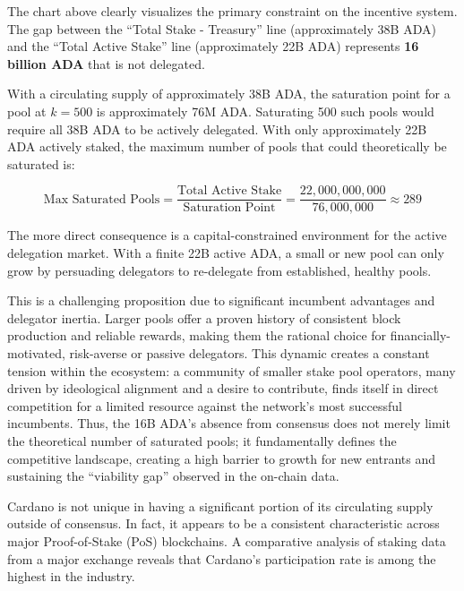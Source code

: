 \documentclass[11pt, letterpaper]{article}
\begin{document}
The chart above clearly visualizes the primary constraint on the incentive
system. The gap between the ``Total Stake - Treasury'' line (approximately 38B
ADA) and the ``Total Active Stake'' line (approximately 22B ADA) represents
\textbf{16 billion ADA} that is not delegated.

With a circulating supply of approximately 38B ADA, the saturation point for a
pool at $k=500$ is approximately 76M ADA\@. Saturating 500 such pools would
require all 38B ADA to be actively delegated. With only approximately 22B ADA
actively staked, the maximum number of pools that could theoretically be
saturated is:

\begin{equation}
	\text{Max Saturated Pools} = \frac{\text{Total Active Stake}}{\text{Saturation Point}} = \frac{22,000,000,000}{76,000,000} \approx 289
\end{equation}

The more direct consequence is a capital-constrained environment for the active
delegation market. With a finite 22B active ADA, a small or new pool
can only grow by persuading delegators to re-delegate from established, healthy pools.

This is a challenging proposition due to significant incumbent
advantages and delegator inertia. Larger pools offer a proven history of
consistent block production and reliable rewards, making them the rational
choice for financially-motivated, risk-averse or passive delegators. This
dynamic creates a constant tension within the ecosystem: a community of smaller stake
pool operators, many driven by ideological alignment and a desire to contribute, finds
itself in direct competition for a limited resource against the network's most
successful incumbents. Thus, the 16B ADA's absence from consensus does not merely limit
the theoretical number of saturated pools; it fundamentally defines the competitive landscape,
creating a high barrier to growth for new entrants and sustaining the
``viability gap'' observed in the on-chain data.

Cardano is not unique in having a significant portion of its circulating supply outside of consensus.
In fact, it appears to be a consistent characteristic across major
Proof-of-Stake (PoS) blockchains. A comparative analysis of staking data from a
major exchange reveals that Cardano's participation rate is among the highest
in the industry.
\end{document}
